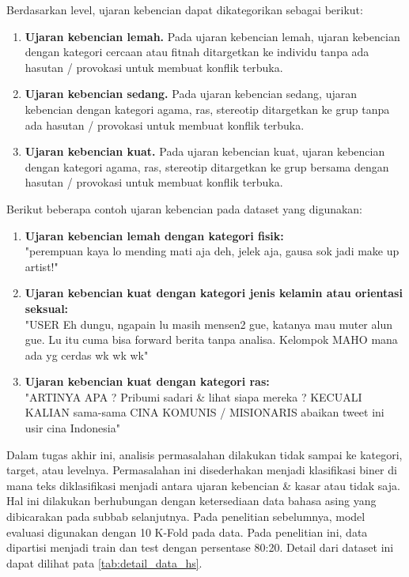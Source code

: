 	Berdasarkan level, ujaran kebencian dapat dikategorikan sebagai berikut:
	\begin{enumerate}
		\item \textbf{Ujaran kebencian lemah.} Pada ujaran kebencian lemah, ujaran kebencian dengan kategori cercaan atau fitnah ditargetkan ke individu tanpa ada hasutan / provokasi untuk membuat konflik terbuka.
		\item \textbf{Ujaran kebencian sedang.} Pada ujaran kebencian sedang, ujaran kebencian dengan kategori agama, ras, stereotip ditargetkan ke grup tanpa ada hasutan / provokasi untuk membuat konflik terbuka.
		\item \textbf{Ujaran kebencian kuat.} Pada ujaran kebencian kuat, ujaran kebencian dengan kategori agama, ras, stereotip ditargetkan ke grup bersama dengan hasutan / provokasi untuk membuat konflik terbuka.
	\end{enumerate}

	Berikut beberapa contoh ujaran kebencian pada dataset yang digunakan:
	
	\begin{enumerate}
		\item \textbf{Ujaran kebencian lemah dengan kategori fisik:} \\ 
		"perempuan kaya lo mending mati aja deh, jelek aja, gausa sok jadi make up artist!"

		\item \textbf{Ujaran kebencian kuat dengan kategori jenis kelamin atau orientasi seksual:} \\
		"USER Eh dungu, ngapain lu masih mensen2 gue, katanya mau muter alun gue. Lu itu cuma bisa forward berita tanpa analisa. Kelompok MAHO mana ada yg cerdas wk wk wk"

		\item \textbf{Ujaran kebencian kuat dengan kategori ras:} \\ 
		"ARTINYA APA ? Pribumi sadari \& lihat siapa mereka ? KECUALI KALIAN sama-sama CINA KOMUNIS / MISIONARIS abaikan tweet ini usir cina Indonesia"
	\end{enumerate}

	Dalam tugas akhir ini, analisis permasalahan dilakukan tidak sampai ke kategori, target, atau levelnya. Permasalahan ini disederhakan menjadi klasifikasi biner di mana teks diklasifikasi menjadi antara ujaran kebencian \& kasar atau tidak saja. Hal ini dilakukan berhubungan dengan ketersediaan data bahasa asing yang dibicarakan pada subbab selanjutnya. Pada penelitian sebelumnya, model evaluasi digunakan dengan 10 K-Fold pada data. Pada penelitian ini, data dipartisi menjadi train dan test dengan persentase 80:20. Detail dari dataset ini dapat dilihat pata \ref{tab:detail_data_hs}.

